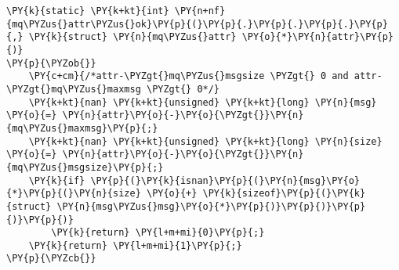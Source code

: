 \begin{Verbatim}[commandchars=\\\{\},codes={\catcode`\$=3\catcode`\^=7\catcode`\_=8}]
\PY{k}{static} \PY{k+kt}{int} \PY{n+nf}{mq\PYZus{}attr\PYZus{}ok}\PY{p}{(}\PY{p}{.}\PY{p}{.}\PY{p}{.}\PY{p}{,} \PY{k}{struct} \PY{n}{mq\PYZus{}attr} \PY{o}{*}\PY{n}{attr}\PY{p}{)}
\PY{p}{\PYZob{}}
    \PY{c+cm}{/*attr-\PYZgt{}mq\PYZus{}msgsize \PYZgt{} 0 and attr-\PYZgt{}mq\PYZus{}maxmsg \PYZgt{} 0*/}
    \PY{k+kt}{nan} \PY{k+kt}{unsigned} \PY{k+kt}{long} \PY{n}{msg} \PY{o}{=} \PY{n}{attr}\PY{o}{-}\PY{o}{\PYZgt{}}\PY{n}{mq\PYZus{}maxmsg}\PY{p}{;}
    \PY{k+kt}{nan} \PY{k+kt}{unsigned} \PY{k+kt}{long} \PY{n}{size} \PY{o}{=} \PY{n}{attr}\PY{o}{-}\PY{o}{\PYZgt{}}\PY{n}{mq\PYZus{}msgsize}\PY{p}{;}
    \PY{k}{if} \PY{p}{(}\PY{k}{isnan}\PY{p}{(}\PY{n}{msg}\PY{o}{*}\PY{p}{(}\PY{n}{size} \PY{o}{+} \PY{k}{sizeof}\PY{p}{(}\PY{k}{struct} \PY{n}{msg\PYZus{}msg}\PY{o}{*}\PY{p}{)}\PY{p}{)}\PY{p}{)}\PY{p}{)}
        \PY{k}{return} \PY{l+m+mi}{0}\PY{p}{;}
    \PY{k}{return} \PY{l+m+mi}{1}\PY{p}{;}
\PY{p}{\PYZcb{}}
\end{Verbatim}
